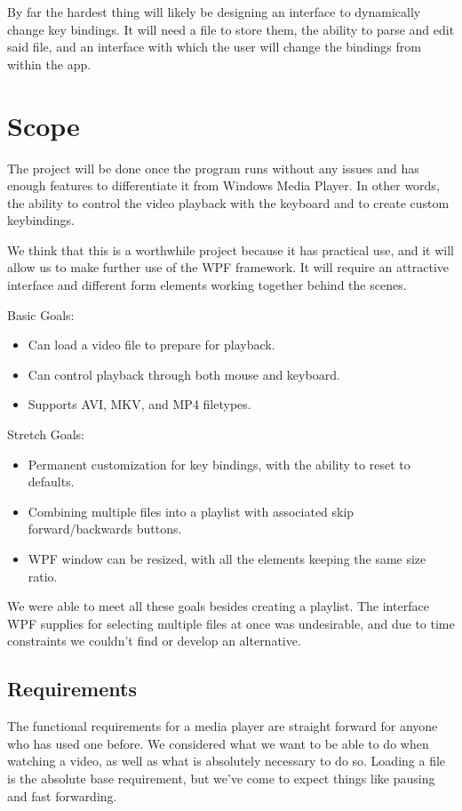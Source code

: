 \documentclass[10pt,conference,onecolumn,compsoc]{IEEEtran}
\begin{document}
By far the hardest thing will likely be designing an interface to dynamically change key bindings. It will need a file to store them, the ability to parse and edit said file, and an interface with which the user will change the bindings from within the app. 


\section{Scope}


The project will be done once the program runs without any issues and has enough features to differentiate it from Windows Media Player. In other words, the ability to control the video playback with the keyboard and to create custom keybindings. 

We think that this is a worthwhile project because it has practical use, and it will allow us to make further use of the WPF framework. It will require an attractive interface and different form elements working together behind the scenes. 

Basic Goals:
\begin{itemize}
\item Can load a video file to prepare for playback.
\item Can control playback through both mouse and keyboard. 
\item Supports AVI, MKV, and MP4 filetypes. 
\end{itemize}

Stretch Goals:
\begin{itemize}

\item Permanent customization for key bindings, with the ability to reset to defaults. 
\item Combining multiple files into a playlist with associated skip forward/backwards buttons.
\item WPF window can be resized, with all the elements keeping the same size ratio. 
\end{itemize}

We were able to meet all these goals besides creating a playlist. The interface WPF supplies for selecting multiple files at once was undesirable, and due to time constraints we couldn't find or develop an alternative.

\subsection{Requirements}
The functional requirements for a media player are straight forward for anyone who has used one before. We considered what we want to be able to do when watching a video, as well as what is absolutely necessary to do so. Loading a file is the absolute base requirement, but we've come to expect things like pausing and fast forwarding.
\end{document}
